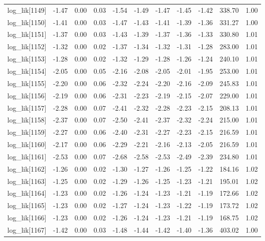 \begin{table}[ht]
\begin{tabular}{rrrrrrrrrrr}
  log\_lik[1149] & -1.47 & 0.00 & 0.03 & -1.54 & -1.49 & -1.47 & -1.45 & -1.42 & 338.70 & 1.00 \\ 
  log\_lik[1150] & -1.41 & 0.00 & 0.03 & -1.47 & -1.43 & -1.41 & -1.39 & -1.36 & 331.27 & 1.00 \\ 
  log\_lik[1151] & -1.37 & 0.00 & 0.03 & -1.43 & -1.39 & -1.37 & -1.36 & -1.33 & 330.80 & 1.01 \\ 
  log\_lik[1152] & -1.32 & 0.00 & 0.02 & -1.37 & -1.34 & -1.32 & -1.31 & -1.28 & 283.00 & 1.01 \\ 
  log\_lik[1153] & -1.28 & 0.00 & 0.02 & -1.32 & -1.29 & -1.28 & -1.26 & -1.24 & 240.10 & 1.01 \\ 
  log\_lik[1154] & -2.05 & 0.00 & 0.05 & -2.16 & -2.08 & -2.05 & -2.01 & -1.95 & 253.00 & 1.01 \\ 
  log\_lik[1155] & -2.20 & 0.00 & 0.06 & -2.32 & -2.24 & -2.20 & -2.16 & -2.09 & 245.83 & 1.01 \\ 
  log\_lik[1156] & -2.19 & 0.00 & 0.06 & -2.31 & -2.23 & -2.19 & -2.15 & -2.07 & 229.00 & 1.01 \\ 
  log\_lik[1157] & -2.28 & 0.00 & 0.07 & -2.41 & -2.32 & -2.28 & -2.23 & -2.15 & 208.13 & 1.01 \\ 
  log\_lik[1158] & -2.37 & 0.00 & 0.07 & -2.50 & -2.41 & -2.37 & -2.32 & -2.24 & 215.00 & 1.01 \\ 
  log\_lik[1159] & -2.27 & 0.00 & 0.06 & -2.40 & -2.31 & -2.27 & -2.23 & -2.15 & 216.59 & 1.01 \\ 
  log\_lik[1160] & -2.17 & 0.00 & 0.06 & -2.29 & -2.21 & -2.16 & -2.13 & -2.05 & 216.59 & 1.01 \\ 
  log\_lik[1161] & -2.53 & 0.00 & 0.07 & -2.68 & -2.58 & -2.53 & -2.49 & -2.39 & 234.80 & 1.01 \\ 
  log\_lik[1162] & -1.26 & 0.00 & 0.02 & -1.30 & -1.27 & -1.26 & -1.25 & -1.22 & 184.16 & 1.02 \\ 
  log\_lik[1163] & -1.25 & 0.00 & 0.02 & -1.29 & -1.26 & -1.25 & -1.23 & -1.21 & 195.01 & 1.02 \\ 
  log\_lik[1164] & -1.23 & 0.00 & 0.02 & -1.26 & -1.24 & -1.23 & -1.21 & -1.19 & 172.66 & 1.02 \\ 
  log\_lik[1165] & -1.23 & 0.00 & 0.02 & -1.27 & -1.24 & -1.23 & -1.22 & -1.19 & 173.72 & 1.02 \\ 
  log\_lik[1166] & -1.23 & 0.00 & 0.02 & -1.26 & -1.24 & -1.23 & -1.21 & -1.19 & 168.75 & 1.02 \\ 
  log\_lik[1167] & -1.42 & 0.00 & 0.03 & -1.48 & -1.44 & -1.42 & -1.40 & -1.36 & 403.02 & 1.00 \\ 

\end{tabular}
\end{table}
